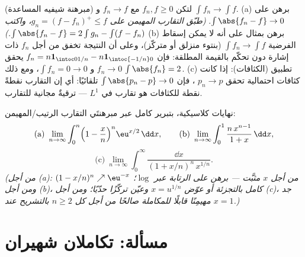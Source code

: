 \begin{exercise}[$\star\star$]\label{exo:b3:lebesgue:11}
(مبرهنة شيفيه المساعدة) لتكن $f_n, f \geq 0$  مع
$f_n \to f$  و $\int f_n \to \int f$.
(a) برهن على $\int\abs{f_n - f} \to 0$. \emph{(طبّق التقارب المهيمن على $g_n = (f - f_n)^+ \leq f$،
واكتب $\int\abs{f_n - f} = 2\int g_n - \int(f - f_n)$.)}
(b) برهن بمثال على أنه لا يمكن إسقاط الفرضية $\int f_n \to \int
f$ (بنتوء
منزلق أو متركّز)، وعلى أن النتيجة تخفق من أجل $f_n$ ذات إشارة
دون تحكّم بالقيمة المطلقة: فإن $f_n = n\mathbf 1_{\intoc0{1/n}} -
n\mathbf 1_{\intoc{-1/n}0}$ يحقق $f_n \to 0$  و $\int f_n
= 0 \to 0$، ومع ذلك $\int\abs{f_n} = 2$.
(c) تطبيق (الكثافات): إذا كانت كثافات احتمالية تحقق $p_n
\to p$ ، فإن $\int\abs{p_n - p} \to 0$ تلقائيًا: أي إن التقارب نقطةً نقطة
للكثافات هو تقارب في $L^1$ --- ترقيةٌ مجانية للتقارب.
\end{exercise}

\begin{exercise}[$\star\star$]\label{exo:b3:lebesgue:12}
نهايات كلاسيكية، بتبرير كامل عبر مبرهنتَي التقارب
الرتيب/المهيمن:
\[
\text{(a)}\ \lim_{n\to\infty}\int_0^n\Bigl(1 -
\frac xn\Bigr)^n\eu^{x/2}\,\dd x, \qquad
\text{(b)}\ \lim_{n\to\infty}\int_0^1\frac{n\,x^{n-1}}{1 +
x}\,\dd x,
\]
\[
\text{(c)}\ \lim_{n\to\infty}\int_0^\infty
\frac{\dd x}{(1 + x/n)^n\,x^{1/n}} .
\]
\emph{(من أجل (a): $(1 - x/n)^n \nearrow \eu^{-x}$ من أجل $x$ مثبَّت --- برهن على
الرتابة عبر $\log$؛ ومن أجل (b)، كامل بالتجزئة أو عوّض
$x = u^{1/n}$ وعيّن تركّزًا حدّيًا؛ ومن أجل (c)، جد مهيمِنًا
قابلًا للمكاملة صالحًا من أجل كل $n \geq 2$ بالتشريح عند
$x =
1$.)}
\end{exercise}

\section{مسألة: تكاملان شهيران}


